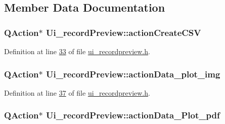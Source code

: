 \subsection{Member Data Documentation}
\hypertarget{a00081_ae81b7303db9e9c5d730c59b86ec0e960}{
\subsubsection[{action\+Create\+C\+S\+V}]{\setlength{\rightskip}{0pt plus 5cm}Q\+Action$\ast$ Ui\+\_\+record\+Preview\+::action\+Create\+C\+S\+V}}\label{a00081_ae81b7303db9e9c5d730c59b86ec0e960}


Definition at line \hyperlink{a00140_source_l00033}{33} of file \hyperlink{a00140_source}{ui\+\_\+recordpreview.\+h}.

\hypertarget{a00081_ae841c150cf6131bef2e8d12da0401ce2}{
\subsubsection[{action\+Data\+\_\+plot\+\_\+img}]{\setlength{\rightskip}{0pt plus 5cm}Q\+Action$\ast$ Ui\+\_\+record\+Preview\+::action\+Data\+\_\+plot\+\_\+img}}\label{a00081_ae841c150cf6131bef2e8d12da0401ce2}


Definition at line \hyperlink{a00140_source_l00037}{37} of file \hyperlink{a00140_source}{ui\+\_\+recordpreview.\+h}.

\hypertarget{a00081_a19203ba5fef3bc68f3d88f1dd3c94777}{
\subsubsection[{action\+Data\+\_\+\+Plot\+\_\+pdf}]{\setlength{\rightskip}{0pt plus 5cm}Q\+Action$\ast$ Ui\+\_\+record\+Preview\+::action\+Data\+\_\+\+Plot\+\_\+pdf}}\label{a00081_a19203ba5fef3bc68f3d88f1dd3c94777}


